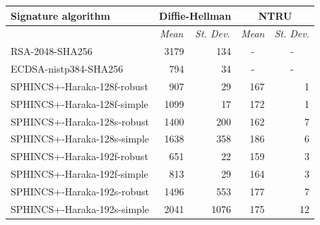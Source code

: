 \documentclass[a4paper,12pt]{article}
\begin{document}
\begin{table}[]
\centering
\begin{tabular}{@{}lrrrr@{}}
\toprule
\textbf{Signature algorithm}  & \multicolumn{2}{c}{\textbf{Diffie-Hellman}} &  \multicolumn{2}{c}{\textbf{NTRU}} \\ \midrule
                            & \multicolumn{1}{c}{\textit{Mean}}           & \multicolumn{1}{c}{\textit{St. Dev.}} & \multicolumn{1}{c}{\textit{Mean}}             & \multicolumn{1}{c}{\textit{St. Dev.}} \\ \hline
RSA-2048-SHA256                     & 3179                                    & 134                        & \multicolumn{1}{c}{-}                         & \multicolumn{1}{c}{-}                 \\
ECDSA-nistp384-SHA256                     & 794                                     & 34                         & \multicolumn{1}{c}{-}                         & \multicolumn{1}{c}{-}                 \\ \hline
SPHINCS+-Haraka-128f-robust   & 907                                      & 29                         & 167                                       & 1                          \\
SPHINCS+-Haraka-128f-simple   & 1099                                    & 17                         & 172                                       & 1                        \\
SPHINCS+-Haraka-128s-robust   & 1400                                    & 200                        & 162                                       & 7                          \\
SPHINCS+-Haraka-128s-simple   & 1638                                    & 358                        & 186                                       & 6                          \\
SPHINCS+-Haraka-192f-robust   & 651                                     & 22                         & 159                                       & 3                          \\
SPHINCS+-Haraka-192f-simple   & 813                                     & 29                         & 164                                       & 3                          \\
SPHINCS+-Haraka-192s-robust   & 1496                                    & 553                        & 177                                       & 7                         \\
SPHINCS+-Haraka-192s-simple   & 2041                                    & 1076                       & 175                                       & 12                         \\

\end{tabular}
\end{table}
\end{document}
